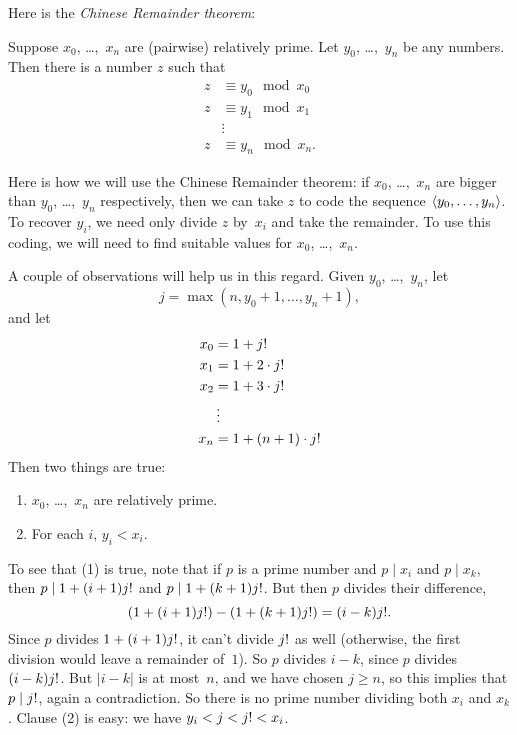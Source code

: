 \documentclass[../../../include/open-logic-section]{subfiles}
\begin{document}
Here is the \emph{Chinese Remainder theorem}:
\begin{thm}
Suppose $x_0$, \dots,~$x_n$ are (pairwise) relatively prime. Let
$y_0$, \dots,~$y_n$ be any numbers. Then there is a number $z$ such that
\begin{align*}
z & \equiv y_0 \mod x_0 \\
z & \equiv y_1 \mod x_1 \\
& \vdots  \\
z & \equiv y_n \mod x_n.
\end{align*}
\end{thm}

Here is how we will use the Chinese Remainder theorem: if $x_0$,
\dots,~$x_n$ are bigger than $y_0$, \dots,~$y_n$ respectively, then we
can take $z$ to code the sequence $\langle y_0, \dots,y_n \rangle$. To recover
$y_i$, we need only divide $z$ by~$x_i$ and take the remainder. To use
this coding, we will need to find suitable values for $x_0$,
\dots,~$x_n$.

A couple of observations will help us in this regard. Given
$y_0$, \dots,~$y_n$, let
\[
j = \max(n, y_0 + 1, \dots, y_n + 1),
\]
and let
\begin{align*}
x_0 & = 1 + j\fac \\
x_1 & = 1 + 2 \cdot j\fac \\
x_2 & = 1 + 3 \cdot j\fac \\
& \vdots  \\
x_n & = 1 + (n+1) \cdot j\fac
\end{align*}
Then two things are true:
\begin{enumerate}
\item $x_0$, \dots,~$x_n$ are relatively prime.
\item For each $i$, $y_i < x_i$.
\end{enumerate}
To see that (1) is true, note that if $p$ is a prime number and $p
\mid x_i$ and $p \mid x_k$, then $p \mid 1 + (i+1) j\text{!}$ and $p \mid
1 + (k+1) j\text{!}$. But then $p$ divides their difference,
\[
(1 + (i+1)j\text{!}) - (1+ (k+1)j\text{!}) = (i-k) j\text{!}.
\]
Since $p$ divides $1 + (i+1)j\text{!}$, it can't divide $j\text{!}$ as well
(otherwise, the first division would leave a remainder of~$1$). So $p$
divides $i-k$, since $p$ divides $(i-k)j\text{!}$. But $\left| i-k
\right|$ is at most~$n$, and we have chosen $j \geq n$, so this implies
that $p \mid j\text{!}$, again a contradiction. So there is no prime
number dividing both $x_i$ and $x_k$. Clause (2) is easy: we have $y_i <
j < j\text{!} < x_i$.
\end{document}
